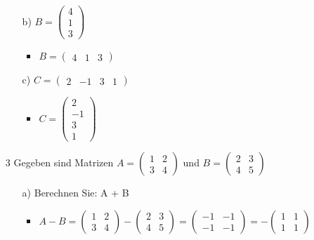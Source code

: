 \documentclass{article}
\begin{document}
\begin{itemize}
\begin{itemize}
			\item[b)]{$B=\begin{pmatrix} 4 \\ 1 \\ 3 \end{pmatrix}$}
			\begin{itemize}
				\item{$B=\begin{pmatrix} 4 & 1 & 3 \end{pmatrix}$}
			\end{itemize}
			\item[c)]{$C=\begin{pmatrix} 2 & -1 & 3 & 1 \end{pmatrix}$}
			\begin{itemize}
				\item{$C=\begin{pmatrix} 2 \\ -1 \\ 3 \\ 1 \end{pmatrix}$}
			\end{itemize}
		\end{itemize}
		\item[3]{Gegeben sind Matrizen $A=\begin{pmatrix} 1 & 2 \\ 3 & 4 \end{pmatrix}$ und $B=\begin{pmatrix} 2 & 3 \\ 4 & 5 \end{pmatrix}$}
		\begin{itemize}
			\item[a)]{Berechnen Sie: A + B}
			\begin{itemize}
				\item{$A-B=\begin{pmatrix} 1 & 2 \\ 3 & 4 \end{pmatrix}-\begin{pmatrix} 2 & 3 \\ 4 & 5 \end{pmatrix}=\begin{pmatrix} -1 & -1 \\ -1 & -1 \end{pmatrix}=-\begin{pmatrix} 1 & 1 \\ 1 & 1 \end{pmatrix}$}
			\end{itemize}
		\end{itemize}

\end{itemize}
\end{document}
